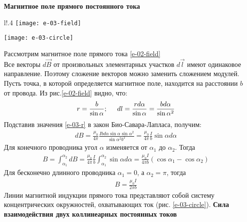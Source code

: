 \documentclass[__main__.tex]{subfiles}
\begin{document}
\textbf{Магнитное поле прямого постоянного тока}\\
\begin{wrapfigure}{l!}{.4\linewidth}
	\texttt{[image: e-03-field]}
	\caption{Магнитное поле прямого тока}
	\label{e-03-field}
	\texttt{[image: e-03-circle]}
	\caption{Силовые линии}
	\label{e-03-circle}
\end{wrapfigure}
Рассмотрим магнитное поле прямого тока	\ref{e-02-field}\\
Все векторы $d\vec{B}$ от произвольных элементарных участков $d\vec{l}$ имеют одинаковое направление. Поэтому сложение векторов можно заменить сложением модулей.\\
Пусть точка, в которой определяется магнитное поле, находится на расстоянии $b$ от провода. Из рис.\ref{e-02-field} видно, что:
\begin{gather}
	r = \frac{b}{\sin{\alpha}}; \hspace{0.5cm} dl = \frac{rd\alpha}{\sin{\alpha}} = \frac{bd\alpha}{\sin{\alpha}^2}
	\label{e-03-r}
\end{gather}
Подставив значения \ref{e-03-r} в закон Био-Савара-Лапласа, получим:
\begin{gather*}
	dB = \frac{\mu_0}{4\pi}\frac{Ibd\alpha\sin{\alpha}\sin{\alpha}^2}{\sin{\alpha}^2b^2} = \frac{\mu_0}{4\pi}\frac{I}{b}\sin{\alpha}d\alpha
\end{gather*}
Для конечного проводника угол $\alpha$ изменяется от $\alpha_1$ до $\alpha_2$. Тогда 
\begin{gather*}
	B = \int_{\alpha_1}^{\alpha_2}{dB} = \frac{\mu_0}{4\pi}\frac{I}{b} \int_{\alpha_1}^{\alpha_2}{\sin{\alpha}d\alpha} = \frac{\mu_0I}{4\pi b}(\cos{\alpha_1} - \cos{\alpha_2})
\end{gather*}
Для бесконечно длинного проводника $\alpha_1 = 0$, а $\alpha_2 = \pi$, тогда
\begin{gather*}
	B = \frac{\mu_0I}{2\pi b}
\end{gather*}
Линии магнитной индукции прямого тока представляют собой систему концентрических окружностей, охватывающих ток (рис. \ref{e-03-circle}).
\newpage
\textbf{Сила взаимодействия двух коллинеарных постоянных токов}\\
\end{document}
